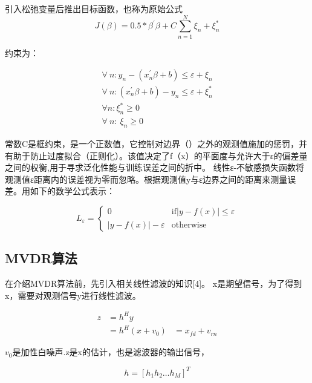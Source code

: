 引入松弛变量后推出目标函数，也称为原始公式
\begin{equation}
J\left(\beta\right)=0.5\ast\beta^\prime\beta+C\sum_{n=1}^{N}{\xi_n+\xi_n^\ast}
\end{equation}

约束为：

\begin{equation}
\begin{gathered}
\forall\ n:y_n-\left(x_n^\prime\beta+b\right)\le\varepsilon+\xi_n\\
\forall\ n:\left(x_n^\prime\beta+b\right)-y_n\le\varepsilon+\xi_n^\ast\\
{\forall n:\xi}_n^\ast\geq0\\
\forall\ n:\ \xi_n\geq0
\end{gathered}
\end{equation}

常数C是框约束，是一个正数值，它控制对\varepsilon 边界（\varepsilon ）之外的观测值施加的惩罚，并有助于防止过度拟合（正则化）。该值决定了f（x）的平面度与允许大于ε的偏差量之间的权衡,用于寻求泛化性能与训练误差之间的折中。
线性ε-不敏感损失函数将观测值ε距离内的误差视为零而忽略。根据观测值y与ε边界之间的距离来测量误差。用如下的数学公式表示：

\begin{equation}
L_\varepsilon= 
\begin{cases}
0&               \text{if} |y-f(x)|\leq \varepsilon\\
|y-f(x)|-\varepsilon&       \text{otherwise}
\end{cases}
\end{equation}

\subsection{MVDR算法}
在介绍MVDR算法前，先引入相关线性滤波的知识[4]。
x是期望信号，为了得到x，需要对观测信号y进行线性滤波。

\begin{equation}
\begin{aligned}
z&=h^Hy\\
&= h^H\left(x+v_0\right)
&=x_{fd}+v_{rn}
\end{aligned}
\end{equation}

$v_0$是加性白噪声.z是x的估计，也是滤波器的输出信号，

\begin{equation}
h=\left[h_1h_2\ldots h_M\right]^T
\end{equation}

